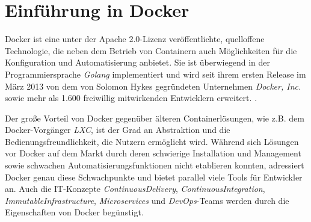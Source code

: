 \documentclass[../main.tex]{subfiles}
\begin{document}


  \section{Einführung in Docker}
  \label{dockerIntro}
    Docker ist eine unter der Apache 2.0-Lizenz veröffentlichte, quelloffene Technologie, die neben dem Betrieb von Containern auch Möglichkeiten für die Konfiguration und Automatisierung anbietet. Sie ist überwiegend in der Programmiersprache \emph{Golang} implementiert und wird seit ihrem ersten Release im März 2013 von dem von Solomon Hykes gegründeten Unternehmen \emph{Docker, Inc.}\cite{dockerHykes} sowie mehr als 1.600 freiwillig mitwirkenden Entwicklern erweitert. \cite{githubDocker}\cite[S.7]{dockerBook}\cite{githubDockerChangelog}\cite{dockerCompany}.




    Der große Vorteil von Docker gegenüber älteren Containerlösungen, wie z.B. dem Docker-Vorgänger \emph{LXC}, ist der Grad an Abstraktion und die Bedienungsfreundlichkeit, die Nutzern ermöglicht wird. Während sich Lösungen vor Docker auf dem Markt durch deren schwierige Installation und Management sowie schwachen Automatisierungsfunktionen nicht etablieren konnten, adressiert Docker genau diese Schwachpunkte \cite[S.7]{dockerBook} und bietet parallel viele Tools für Entwickler an. Auch die IT-Konzepte \emph{\gls{ContinuousDelivery}}, \emph{\gls{ContinuousIntegration}}, \emph{\gls{ImmutableInfrastructure}}, \emph{\glspl{Microservice}} und \emph{\gls{DevOps}}-Teams werden durch die Eigenschaften von Docker begünstigt.
\end{document}
